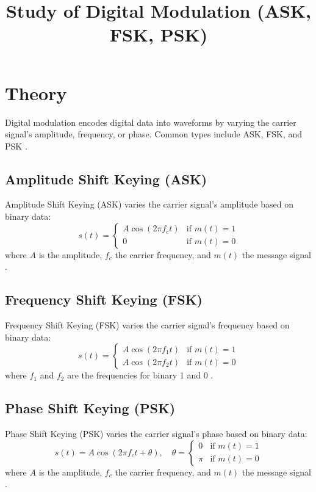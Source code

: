 \documentclass[12pt]{article}
\title{Study of Digital Modulation (ASK, FSK, PSK)}
\author{}
\date{}
\begin{document}


\pagebreak

\tableofcontents

\pagebreak
{}
\maketitle

\section*{Theory}
Digital modulation encodes digital data into waveforms by varying the carrier signal's amplitude, frequency, or phase. Common types include ASK, FSK, and PSK \cite{proakis2007digital}.

\subsection*{Amplitude Shift Keying (ASK)}
Amplitude Shift Keying (ASK) varies the carrier signal's amplitude based on binary data:
\[
    s(t) =
    \begin{cases}
        A \cos(2 \pi f_c t) & \text{if } m(t) = 1 \\
        0                   & \text{if } m(t) = 0
    \end{cases}
\]
where \( A \) is the amplitude, \( f_c \) the carrier frequency, and \( m(t) \) the message signal \cite{sklar2001digital}.

\subsection*{Frequency Shift Keying (FSK)}
Frequency Shift Keying (FSK) varies the carrier signal's frequency based on binary data:
\[
    s(t) =
    \begin{cases}
        A \cos(2 \pi f_1 t) & \text{if } m(t) = 1 \\
        A \cos(2 \pi f_2 t) & \text{if } m(t) = 0
    \end{cases}
\]
where \( f_1 \) and \( f_2 \) are the frequencies for binary 1 and 0 \cite{haykin2001communication}.

\subsection*{Phase Shift Keying (PSK)}
Phase Shift Keying (PSK) varies the carrier signal's phase based on binary data:
\[
    s(t) = A \cos(2 \pi f_c t + \theta), \quad
    \theta =
    \begin{cases}
        0   & \text{if } m(t) = 1 \\
        \pi & \text{if } m(t) = 0
    \end{cases}
\]
where \( A \) is the amplitude, \( f_c \) the carrier frequency, and \( m(t) \) the message signal \cite{lathi2009modern}.
\end{document}
